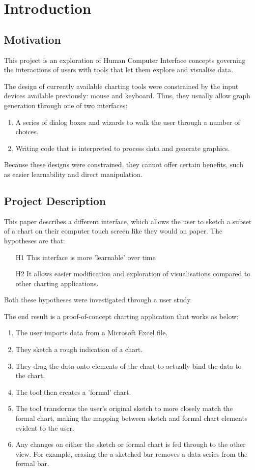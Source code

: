 \chapter{Introduction}
\section{Motivation}
This project is an exploration of Human Computer Interface concepts governing the interactions of users with tools that let them explore and visualise data.

The design of currently available charting tools were constrained by the input devices available previously: mouse and keyboard. Thus, they usually allow graph generation through one of two interfaces:
\begin{enumerate}
\item A series of dialog boxes and wizards to walk the user through a number of choices.
\item Writing code that is interpreted to process data and generate graphics.
\end{enumerate}

Because these designs were constrained, they cannot offer certain benefits, such as easier learnability and direct manipulation.

\section{Project Description}
This paper describes a different interface, which allows the user to sketch a subset of a chart on their computer touch screen like they would on paper. The hypotheses are that:
\begin{enumerate}
\item[H1] This interface is more 'learnable' over time
\item[H2] It allows easier modification and exploration of visualisations compared to other charting applications.
\end{enumerate}

Both these hypotheses were investigated through a user study.

The end result is a proof-of-concept charting application that works as below:
\begin{enumerate}
\item The user imports data from a Microsoft Excel file.
\item They sketch a rough indication of a chart.
\item They drag the data onto elements of the chart to actually bind the data to the chart. 
\item The tool then creates a 'formal' chart.
\item The tool transforms the user's original sketch to more closely match the formal chart, making the mapping between sketch and formal chart elements evident to the user.
\item Any changes on either the sketch or formal chart is fed through to the other view. For example, erasing the a sketched bar removes a data series from the formal bar.
\end{enumerate}

